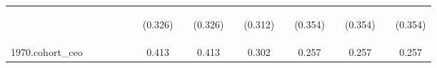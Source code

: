 \begin{center}
\begin{tabular}{lcccccccccccccccc}
\vspace{4pt} & \begin{footnotesize}\end{footnotesize} & \begin{footnotesize}\end{footnotesize} & \begin{footnotesize}\end{footnotesize} & \begin{footnotesize}\end{footnotesize} & \begin{footnotesize}\end{footnotesize} & \begin{footnotesize}(0.326)\end{footnotesize} & \begin{footnotesize}\end{footnotesize} & \begin{footnotesize}(0.326)\end{footnotesize} & \begin{footnotesize}\end{footnotesize} & \begin{footnotesize}(0.312)\end{footnotesize} & \begin{footnotesize}\end{footnotesize} & \begin{footnotesize}(0.354)\end{footnotesize} & \begin{footnotesize}\end{footnotesize} & \begin{footnotesize}(0.354)\end{footnotesize} & \begin{footnotesize}\end{footnotesize} & \begin{footnotesize}(0.354)\end{footnotesize} \\
1970.cohort\_ceo &  &  &  &  &  & 0.413 &  & 0.413 &  & 0.302 &  & 0.257 &  & 0.257 &  & 0.257 \\

\end{tabular}
\end{center}
